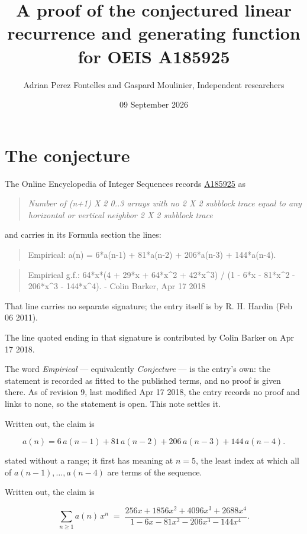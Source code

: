 \documentclass[11pt]{article}
\title{A proof of the conjectured linear recurrence and generating function for OEIS A185925}
\author{Adrian Perez Fontelles and Gaspard Moulinier, Independent researchers}
\date{09 September 2026}
\theoremstyle{definition}
\begin{document}
\maketitle
\section{The conjecture}

The Online Encyclopedia of Integer Sequences records \href{https://oeis.org/A185925}{A185925} as

\begin{quote}\itshape Number of (n+1) X 2 0..3 arrays with no 2 X 2 subblock trace equal to any horizontal or vertical neighbor 2 X 2 subblock trace\end{quote}

and carries in its Formula section the lines:

\begin{quote}\ttfamily Empirical: a(n) = 6*a(n-1) + 81*a(n-2) + 206*a(n-3) + 144*a(n-4).\end{quote}

\begin{quote}\ttfamily Empirical g.f.: 64*x*(4 + 29*x + 64*x\textasciicircum{}2 + 42*x\textasciicircum{}3) / (1 - 6*x - 81*x\textasciicircum{}2 - 206*x\textasciicircum{}3 - 144*x\textasciicircum{}4). - Colin Barker, Apr 17 2018\end{quote}

That line carries no separate signature; the entry itself is by R. H. Hardin (Feb 06 2011).

The line quoted ending in that signature is contributed by Colin Barker on Apr 17 2018.

The word {\itshape Empirical} --- equivalently {\itshape Conjecture} --- is the entry's own: the statement is recorded as fitted to the published terms, and no proof is given there. As of revision 9, last modified Apr 17 2018, the entry records no proof and links to none, so the statement is open. This note settles it.

Written out, the claim is

\[a(n) = 6\,a(n-1) + 81\,a(n-2) + 206\,a(n-3) + 144\,a(n-4).\]

stated without a range; it first has meaning at $n = 5$, the least index at which all of $a(n-1),\dots,a(n-4)$ are terms of the sequence.

Written out, the claim is

\[\sum_{n \ge 1} a(n)\,x^n \;=\; \frac{256x + 1856x^{2} + 4096x^{3} + 2688x^{4}}{1 - 6x - 81x^{2} - 206x^{3} - 144x^{4}}.\]
\end{document}
